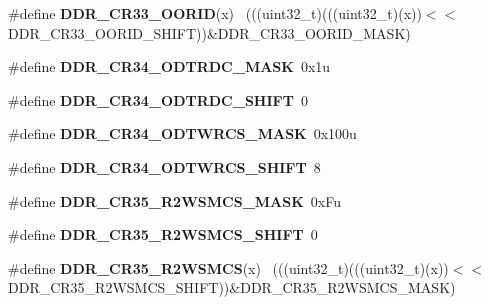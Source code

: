 \begin{DoxyCompactItemize}
\item 
\hypertarget{group___d_d_r___register___masks_gaa8783a1bdf1a5ece1de0f26b9a5a1458}{}\#define {\bfseries D\+D\+R\+\_\+\+C\+R33\+\_\+\+O\+O\+R\+I\+D}(x)                                            ~(((uint32\+\_\+t)(((uint32\+\_\+t)(x))$<$$<$D\+D\+R\+\_\+\+C\+R33\+\_\+\+O\+O\+R\+I\+D\+\_\+\+S\+H\+I\+F\+T))\&D\+D\+R\+\_\+\+C\+R33\+\_\+\+O\+O\+R\+I\+D\+\_\+\+M\+A\+S\+K)\label{group___d_d_r___register___masks_gaa8783a1bdf1a5ece1de0f26b9a5a1458}

\item 
\hypertarget{group___d_d_r___register___masks_ga541b9057c03e9742fcd7f69d21c05d31}{}\#define {\bfseries D\+D\+R\+\_\+\+C\+R34\+\_\+\+O\+D\+T\+R\+D\+C\+\_\+\+M\+A\+S\+K}~0x1u\label{group___d_d_r___register___masks_ga541b9057c03e9742fcd7f69d21c05d31}

\item 
\hypertarget{group___d_d_r___register___masks_ga698980d26d0c10f7f3b7e2e3258e5651}{}\#define {\bfseries D\+D\+R\+\_\+\+C\+R34\+\_\+\+O\+D\+T\+R\+D\+C\+\_\+\+S\+H\+I\+F\+T}~0\label{group___d_d_r___register___masks_ga698980d26d0c10f7f3b7e2e3258e5651}

\item 
\hypertarget{group___d_d_r___register___masks_gaad31e1c30841ddfe3a2dc2a5f0f0982e}{}\#define {\bfseries D\+D\+R\+\_\+\+C\+R34\+\_\+\+O\+D\+T\+W\+R\+C\+S\+\_\+\+M\+A\+S\+K}~0x100u\label{group___d_d_r___register___masks_gaad31e1c30841ddfe3a2dc2a5f0f0982e}

\item 
\hypertarget{group___d_d_r___register___masks_gaca2a7038837a0ac077cefbad527d56b5}{}\#define {\bfseries D\+D\+R\+\_\+\+C\+R34\+\_\+\+O\+D\+T\+W\+R\+C\+S\+\_\+\+S\+H\+I\+F\+T}~8\label{group___d_d_r___register___masks_gaca2a7038837a0ac077cefbad527d56b5}

\item 
\hypertarget{group___d_d_r___register___masks_ga6540a597104bb7336b874b2cf07f29bb}{}\#define {\bfseries D\+D\+R\+\_\+\+C\+R35\+\_\+\+R2\+W\+S\+M\+C\+S\+\_\+\+M\+A\+S\+K}~0x\+Fu\label{group___d_d_r___register___masks_ga6540a597104bb7336b874b2cf07f29bb}

\item 
\hypertarget{group___d_d_r___register___masks_ga9a5fb8fab760f5bbbf5737a79ec3d94a}{}\#define {\bfseries D\+D\+R\+\_\+\+C\+R35\+\_\+\+R2\+W\+S\+M\+C\+S\+\_\+\+S\+H\+I\+F\+T}~0\label{group___d_d_r___register___masks_ga9a5fb8fab760f5bbbf5737a79ec3d94a}

\item 
\hypertarget{group___d_d_r___register___masks_ga31d79c7354d9554684e22270b02430bf}{}\#define {\bfseries D\+D\+R\+\_\+\+C\+R35\+\_\+\+R2\+W\+S\+M\+C\+S}(x)                                        ~(((uint32\+\_\+t)(((uint32\+\_\+t)(x))$<$$<$D\+D\+R\+\_\+\+C\+R35\+\_\+\+R2\+W\+S\+M\+C\+S\+\_\+\+S\+H\+I\+F\+T))\&D\+D\+R\+\_\+\+C\+R35\+\_\+\+R2\+W\+S\+M\+C\+S\+\_\+\+M\+A\+S\+K)\label{group___d_d_r___register___masks_ga31d79c7354d9554684e22270b02430bf}


\end{DoxyCompactItemize}
